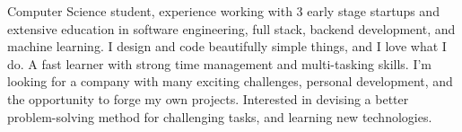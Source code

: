 

\begin{cvparagraph}

Computer Science student, experience working with 3 early stage startups and extensive education in software engineering, full stack, backend development, and machine learning. I design and code beautifully simple things, and I love what I do. A fast learner with strong time management and multi-tasking skills.  I’m looking for a company with many exciting challenges, personal development, and the opportunity to forge my own projects. Interested in devising a better problem-solving method for challenging tasks, and learning new technologies.

\end{cvparagraph}
